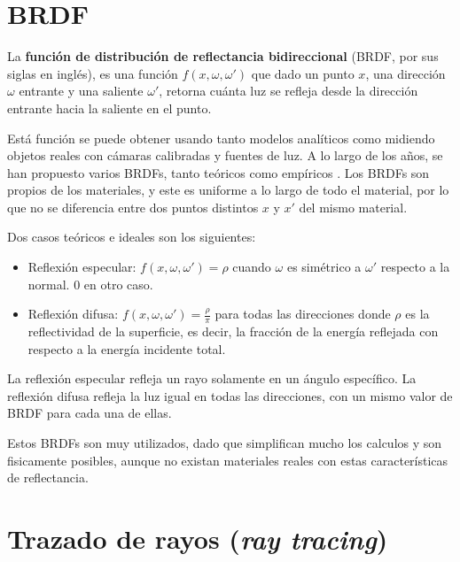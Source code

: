 \section{BRDF}\label{sec:brdf}

La \textbf{función de distribución de reflectancia bidireccional} (BRDF, por sus siglas en inglés), es una función $f(x, \omega, \omega')$ que dado un punto $x$, una dirección $\omega$ entrante y una saliente $\omega'$, retorna cuánta luz se refleja desde la dirección entrante hacia la saliente en el punto.

Está función se puede obtener usando tanto modelos analíticos como midiendo objetos reales con cámaras calibradas y fuentes de luz.
A lo largo de los años, se han propuesto varios BRDFs, tanto teóricos como empíricos \cite{review-of-brdf-models}.
Los BRDFs son propios de los materiales, y este es uniforme a lo largo de todo el material, por lo que no se diferencia entre dos puntos distintos $x$ y $x'$ del mismo material.


Dos casos teóricos e ideales son los siguientes:

\begin{itemize}
    \item Reflexión especular: $f(x, \omega, \omega') = \rho$ cuando $\omega$ es simétrico a $\omega'$ respecto a la normal. $0$ en otro caso.
    \item Reflexión difusa: $f(x, \omega, \omega') = \frac{\rho}{\pi}$ para todas las direcciones donde $\rho$ es la reflectividad de la superficie, es decir, la fracción de la energía reflejada con respecto a la energía incidente total.
\end{itemize}

La reflexión especular refleja un rayo solamente en un ángulo específico.
La reflexión difusa refleja la luz igual en todas las direcciones, con un mismo valor de BRDF para cada una de ellas.

Estos BRDFs son muy utilizados, dado que simplifican mucho los calculos y son fisicamente posibles, aunque no existan materiales reales con estas características de reflectancia.

\section{Trazado de rayos (\textit{ray tracing})}\label{sec:ray-tracing}

